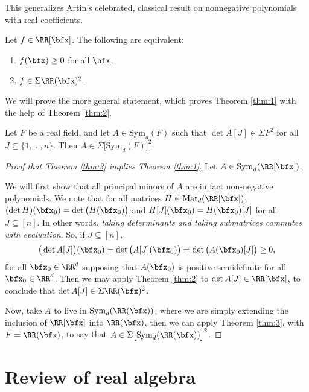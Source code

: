 \documentclass{article}
\newcommand*\Mat{\mathrm{Mat}}
\newcommand*\Sym{\mathrm{Sym}}
\begin{document}
This generalizes Artin's celebrated, classical result on nonnegative polynomials with real coefficients. 

\begin{theorem}
    \label{thm:2}
    Let $f \in \RR[\bfx]$.
    The following are equivalent:
    \begin{enumerate}[label=(\roman*)]
        \item 
            $f(\bfx) \geq 0$ for all $\bfx$.
        \item 
            $f \in \Sigma \RR(\bfx)^2$.
    \end{enumerate}
\end{theorem}

We will prove the more general statement, which proves Theorem \ref{thm:1} with the help of Theorem \ref{thm:2}.

\begin{theorem}
    \label{thm:3}
    Let $F$ be a real field, and let $A \in \Sym_d(F)$ such that $\det A[J] \in \Sigma F^2$ for all $J \subseteq \{1,\ldots,n\}$.
Then $A \in \Sigma \big[\Sym_d(F)\big]^2$.
\end{theorem}

\begin{proof}[Proof that Theorem \ref{thm:3} implies Theorem \ref{thm:1}]
    Let $A \in \Sym_d(\RR[\bfx])$.

    We will first show that all principal minors of $A$ are in fact non-negative polynomials.
    We note that for all matrices $H \in \Mat_d(\RR[\bfx])$, $(\det H)(\bfx_0)=\det\big(H(\bfx_0)\big)$ and $H[J](\bfx_0) = H(\bfx_0)[J]$ for all $J \subseteq [n]$.
    In other words, \textit{taking determinants and taking submatrices commutes with evaluation}.
    So, if $J \subseteq [n]$,
    \[
        \big(\det A[J]\big)(\bfx_0)
        = \det \big(A[J](\bfx_0)\big)
        = \det \big(A(\bfx_0)[J]\big)
        \geq 0,
    \]
    for all $\bfx_0 \in \RR^d$ supposing that $A(\bfx_0)$ is positive semidefinite for all $\bfx_0 \in \RR^d$.
    Then we may apply Theorem \ref{thm:2} to $\det A[J] \in \RR[\bfx]$, to conclude that $\det A[J] \in \Sigma \RR(\bfx)^2$.

    Now, take $A$ to live in $\Sym_d(\RR(\bfx))$, where we are simply extending the inclusion of $\RR[\bfx]$ into $\RR(\bfx)$, then we can apply Theorem \ref{thm:3}, with $F = \RR(\bfx)$, to say that $A \in \Sigma\big[\Sym_d(\RR(\bfx))\big]^2$.
\end{proof}

\section{Review of real algebra}
\end{document}
